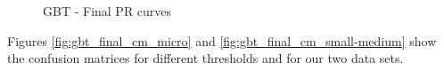 \documentclass[LaM,binding=0.6cm, english]{sapthesis}
\begin{document}
\begin{figure}[!ht]
  \centering
  \hfill
  \caption{GBT - Final PR curves}
\end{figure}

Figures \ref{fig:gbt_final_cm_micro} and \ref{fig:gbt_final_cm_small-medium} show the confusion matrices for different thresholds and for our two data sets. 
\end{document}
